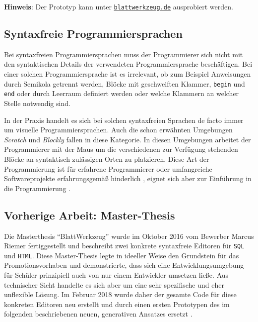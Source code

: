 \documentclass[paper=a4,fontsize=11pt,parskip=half]{scrartcl}
\begin{document}
\begin{framed}
  \textbf{Hinweis}: Der Prototyp kann unter \href{https://blattwerkzeug.de}{\texttt{blattwerkzeug.de}} ausprobiert werden.
\end{framed}

\subsection{Syntaxfreie Programmiersprachen}

Bei syntaxfreien Programmiersprachen muss der Programmierer sich nicht mit den syntaktischen Details der verwendeten Programmiersprache beschäftigen. Bei einer solchen Programmiersprache ist es irrelevant, ob zum Beispiel Anweisungen durch Semikola getrennt werden, Blöcke mit geschweiften Klammer, \texttt{begin} und \texttt{end} oder durch Leerraum definiert werden oder welche Klammern an welcher Stelle notwendig sind.

In der Praxis handelt es sich bei solchen syntaxfreien Sprachen de facto immer um visuelle Programmiersprachen. Auch die schon erwähnten Umgebungen \textit{Scratch} und \textit{Blockly} fallen in diese Kategorie. In diesen Umgebungen arbeitet der Programmierer mit der Maus um die verschiedenen zur Verfügung stehenden Blöcke an syntaktisch zulässigen Orten zu platzieren. Diese Art der Programmierung ist für erfahrene Programmierer oder umfangreiche Softwareprojekte erfahrungsgemäß hinderlich \cite[S. 262f]{schiffer_visuelle_2001}, eignet sich aber zur Einführung in die Programmierung \cite{resnick_scratch:_2009}.

\subsection{Vorherige Arbeit: Master-Thesis}

Die Masterthesis \enquote{BlattWerkzeug} \cite{riemer_blattwerkzeug_2016}  wurde im Oktober 2016 vom Bewerber Marcus Riemer fertiggestellt und beschreibt zwei konkrete syntaxfreie Editoren für \texttt{SQL} und \texttt{HTML}. Diese Master-Thesis legte in ideeller Weise den Grundstein für das Promotionsvorhaben und demonstrierte, dass sich eine Entwicklungsumgebung für Schüler prinzipiell auch von nur einem Entwickler umsetzen ließe. Aus technischer Sicht handelte es sich aber um eine sehr spezifische und eher unflexible Lösung. Im Februar 2018 wurde daher der gesamte Code für diese konkreten Editoren neu erstellt und durch einen ersten Prototypen des im folgenden beschriebenen neuen, generativen Ansatzes ersetzt \cite{riemer_commit_2018}.
\end{document}
